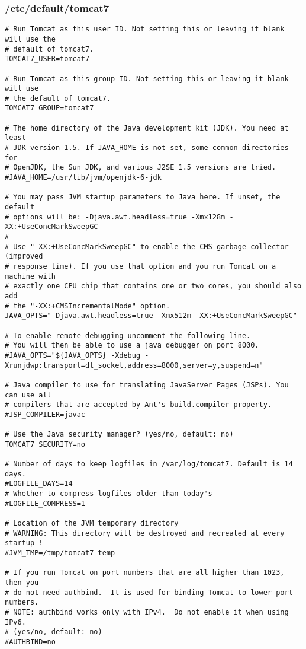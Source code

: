 \subsubsection{/etc/default/tomcat7}
\begin{lstlisting}
# Run Tomcat as this user ID. Not setting this or leaving it blank will use the
# default of tomcat7.
TOMCAT7_USER=tomcat7

# Run Tomcat as this group ID. Not setting this or leaving it blank will use
# the default of tomcat7.
TOMCAT7_GROUP=tomcat7

# The home directory of the Java development kit (JDK). You need at least
# JDK version 1.5. If JAVA_HOME is not set, some common directories for
# OpenJDK, the Sun JDK, and various J2SE 1.5 versions are tried.
#JAVA_HOME=/usr/lib/jvm/openjdk-6-jdk

# You may pass JVM startup parameters to Java here. If unset, the default
# options will be: -Djava.awt.headless=true -Xmx128m -XX:+UseConcMarkSweepGC
#
# Use "-XX:+UseConcMarkSweepGC" to enable the CMS garbage collector (improved
# response time). If you use that option and you run Tomcat on a machine with
# exactly one CPU chip that contains one or two cores, you should also add
# the "-XX:+CMSIncrementalMode" option.
JAVA_OPTS="-Djava.awt.headless=true -Xmx512m -XX:+UseConcMarkSweepGC"

# To enable remote debugging uncomment the following line.
# You will then be able to use a java debugger on port 8000.
#JAVA_OPTS="${JAVA_OPTS} -Xdebug -Xrunjdwp:transport=dt_socket,address=8000,server=y,suspend=n"

# Java compiler to use for translating JavaServer Pages (JSPs). You can use all
# compilers that are accepted by Ant's build.compiler property.
#JSP_COMPILER=javac

# Use the Java security manager? (yes/no, default: no)
TOMCAT7_SECURITY=no

# Number of days to keep logfiles in /var/log/tomcat7. Default is 14 days.
#LOGFILE_DAYS=14
# Whether to compress logfiles older than today's
#LOGFILE_COMPRESS=1

# Location of the JVM temporary directory
# WARNING: This directory will be destroyed and recreated at every startup !
#JVM_TMP=/tmp/tomcat7-temp

# If you run Tomcat on port numbers that are all higher than 1023, then you
# do not need authbind.  It is used for binding Tomcat to lower port numbers.
# NOTE: authbind works only with IPv4.  Do not enable it when using IPv6.
# (yes/no, default: no)
#AUTHBIND=no
\end{lstlisting}

